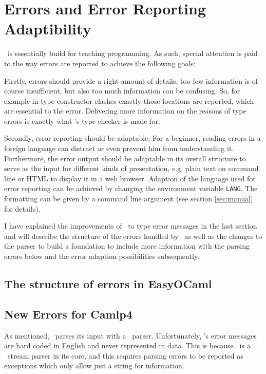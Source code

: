 
\section{Errors and Error Reporting Adaptibility}
\label{sec:errors}

\easyocaml\ is essentially build for teaching programming.
As such, special attention is paid to the way errors are reported to achieve
the following goals:

Firstly, errors should provide a right amount of details, too few information
is of course insufficient, but also too much information can be confusing. So,
for example in type constructor clashes exactly those locations are reported,
which are essential to the error.
Delivering more information on the reasons of type errors is exactly what
\easyocaml's type checker is made for.

Secondly, error reporting should be adaptable: For a beginner, reading 
errors in a foreign language can distract or even prevent him from 
understanding it.
Furthermore\new, the error output should be adaptable in its overall structure to
serve as the input for different kinds of presentation, e.g. plain text on
command line or HTML to display it in a web browser.
Adaption of the language used for error reporting can be achieved by changing 
the environment variable \texttt{LANG}. The formatting can be given by a
command line argument (see section \ref{sec:manual} for details).

I have explained the improvements of \easyocaml\ to type error messages in the
last section and will describe the structure  of the errors handled by
\easyocaml\ as well as the changes to the parser to build a foundation to
include more information with the parsing errors below and the error adaption
possibilities subsequently.

\subsection{The structure of errors in EasyOCaml}
\label{sec:easyerrors}


\subsection{New Errors for Camlp4}
\label{hd003001}
As mentioned, \easyocaml\ parses its input with a \camlpf\ parser.  
Unfortunately, \camlpf's error messages are hard coded in English and never
represented in data.  This is because \camlpf\ is a \ocaml\ stream parser in its
core, and this requires parsing errors to be reported as exceptions which only
allow just a string for information.

